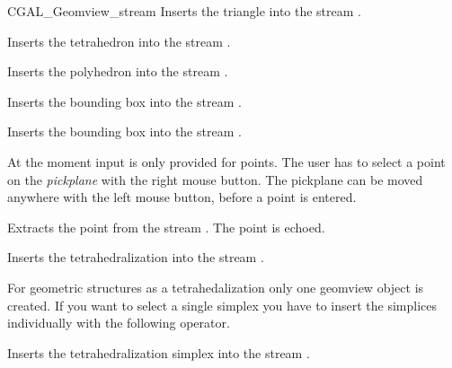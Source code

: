 \begin{ccClass}{CGAL_Geomview_stream}
{Inserts the triangle  into the stream \ccVar.}


{Inserts the tetrahedron  into the stream \ccVar.}


{Inserts the polyhedron  into the stream \ccVar.}


{Inserts the bounding box  into the stream \ccVar.}

{Inserts the bounding box  into the stream \ccVar.}



At the moment input is only provided for points. The user has to select
a point on the {\it pickplane} with the right mouse button. The pickplane
can be moved anywhere with the left mouse button, before a point is entered.

{Extracts the point  from the stream \ccVar. The point is
 echoed.}




{Inserts the tetrahedralization  into the stream \ccVar.}

For geometric structures as a tetrahedalization only one geomview
object is created. If you want to select a single simplex you have
to insert the simplices individually with the following operator.

{Inserts the tetrahedralization simplex  into the stream \ccVar.}



\end{ccClass}
